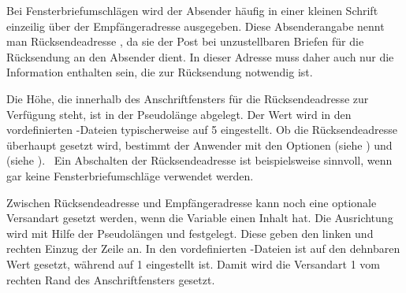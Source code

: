\begin{Declaration}
\end{Declaration}
Bei Fensterbriefumschlägen wird der Absender häufig in einer kleinen Schrift
einzeilig über der Empfängeradresse ausgegeben. Diese Absenderangabe nennt man
Rücksendeadresse%
, da sie der Post bei unzustellbaren Briefen für die Rücksendung
an den Absender dient. In dieser Adresse muss daher auch nur die Information
enthalten sein, die zur Rücksendung notwendig ist.

Die Höhe, die innerhalb des Anschriftfensters für die Rücksendeadresse zur
Verfügung steht, ist in der Pseudolänge  abgelegt. Der
Wert wird in den vordefinierten -Dateien
typischerweise auf 5 eingestellt.  Ob die Rücksendeadresse überhaupt
gesetzt wird, bestimmt der Anwender mit den Optionen
 (siehe
) und
 (siehe
).%
\iftrue%
\ Ein Abschalten der Rücksendeadresse ist beispielsweise sinnvoll, wenn gar
keine Fensterbriefumschläge verwendet werden.%
\fi%
\EndIndexGroup


\begin{Declaration}
\end{Declaration}
Zwischen Rücksendeadresse und Empfängeradresse kann noch eine optionale
Versandart gesetzt werden, wenn die Variable 
einen Inhalt hat. Die Ausrichtung wird mit Hilfe der Pseudolängen
 und 
festgelegt. Diese geben den linken und rechten Einzug der Zeile an. In den
vordefinierten -Dateien ist
 auf den dehnbaren Wert  gesetzt,
während  auf 1 eingestellt ist. Damit
wird die Versandart 1 vom rechten Rand des Anschriftfensters
gesetzt.%
\EndIndexGroup


